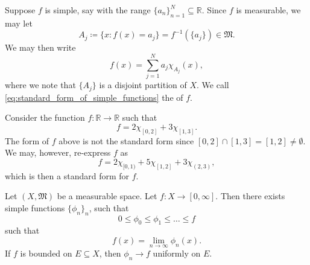 \documentclass[notoc,notitlepage]{tufte-book}
\begin{document}
\begin{note}\label{note:standard_form_of_simple_functions}
  Suppose $f$ is simple, say with the range
  $\{ a_n \}_{n=1}^{N} \subseteq \mathbb{R}$.
  Since $f$ is measurable, we may let
  \begin{equation*}
    A_j \coloneqq \{ x : f(x) = a_j \} = f^{-1}(\{a_j\}) \in \mathfrak{M}.
  \end{equation*}
  We may then write
  \begin{equation}\label{eq:standard_form_of_simple_functions}
    f(x) = \sum_{j=1}^{N} a_j \chi_{A_j}(x),
  \end{equation}
  where we note that $\{ A_j \}$ is a disjoint partition of $X$.
  We call \cref{eq:standard_form_of_simple_functions} the 
  of $f$.
\end{note}

\begin{eg}
  Consider the function $f : \mathbb{R} \to \mathbb{R}$ such that
  \begin{equation*}
    f = 2 \chi_{[0, 2]} + 3 \chi_{[1, 3]}.
  \end{equation*}
  The form of $f$ above is not the standard form since
  $[0, 2] \cap [1, 3] = [1, 2] \neq \emptyset$.
  We may, however, re-express $f$ as
  \begin{equation*}
    f = 2 \chi_{[0, 1)} + 5 \chi_{[1, 2]} + 3 \chi_{(2, 3)},
  \end{equation*}
  which is then a standard form for $f$.
\end{eg}

\begin{thm}\label{thm:increasing_sequence_of_simple_functions_converges_an_arbitrary_measurable_function}
  Let $(X, \mathfrak{M})$ be a measurable space.
  Let $f : X \to [0, \infty]$.
  Then there exists simple functions $\{ \phi_n \}_{n}$, such that
  \begin{equation*}
    0 \leq \phi_0 \leq \phi_1 \leq \hdots \leq f
  \end{equation*}
  such that
  \begin{equation*}
    f(x) = \lim_{n \to \infty} \phi_n(x).
  \end{equation*}
  If $f$ is bounded on $E \subseteq X$, then
  $\phi_n \to f$ uniformly on $E$.
\end{thm}
\end{document}
